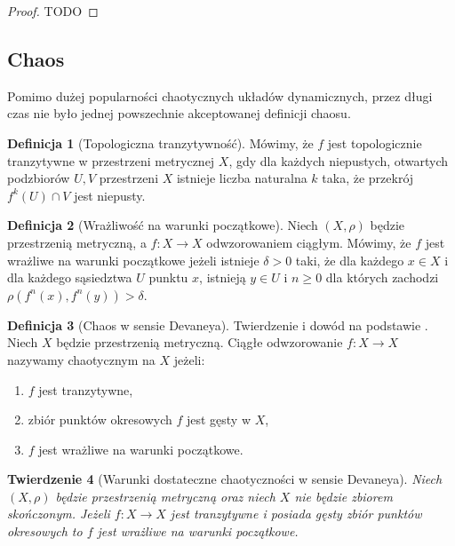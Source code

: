\documentclass[licencjacka]{pwr_wmat_praca_dyplomowa}
\theoremstyle{plain}
\newtheorem{theorem}{Twierdzenie}
\numberwithin{theorem}{chapter}
\theoremstyle{definition}
\numberwithin{theorem}{chapter}
\newtheorem{definition}[theorem]{Definicja}
\begin{document}
\begin{proof}
TODO
\end{proof}



\subsection{Chaos}

\cite{onDeveneyDefinitionOfChaos}

Pomimo dużej popularności chaotycznych układów dynamicznych, przez długi czas nie było jednej powszechnie akceptowanej definicji chaosu.

\begin{definition}[Topologiczna tranzytywność]
\cite{onDeveneyDefinitionOfChaos}
Mówimy, że $f$ jest topologicznie tranzytywne w przestrzeni metrycznej $X$, gdy dla każdych niepustych, otwartych podzbiorów $U, V$ przestrzeni $X$ istnieje liczba naturalna $k$ taka, że przekrój $f^k(U) \cap V$ jest niepusty.
\end{definition}

\begin{definition}[Wrażliwość na warunki początkowe]
\cite{balibrea2003topological}
Niech $(X, \rho)$ będzie przestrzenią metryczną, a $f: X \rightarrow X$ odwzorowaniem ciągłym.
Mówimy, że $f$ jest wrażliwe na warunki początkowe jeżeli  istnieje $\delta > 0$ taki, że dla każdego $x \in X$ i dla każdego sąsiedztwa $U$ punktu $x$, istnieją $y \in U$ i $n \geq 0$ dla których zachodzi $\rho(f^n(x), f^n(y)) > \delta$.
\end{definition}

\begin{definition}[Chaos w sensie Devaneya]
Twierdzenie i dowód na podstawie \cite{onDeveneyDefinitionOfChaos}.
Niech $X$ będzie przestrzenią metryczną. Ciągłe odwzorowanie $f: X \rightarrow X$ nazywamy chaotycznym na $X$ jeżeli:
\begin{enumerate}
\item $f$ jest tranzytywne,
\item zbiór punktów okresowych $f$ jest gęsty w $X$,
\item $f$ jest wrażliwe na warunki początkowe.
\end{enumerate}
\end{definition}


\begin{theorem}
[Warunki dostateczne chaotyczności w sensie Devaneya]
\label{warunki_dostateczne_chaotycznosci_devaneya}
\cite{onDeveneyDefinitionOfChaos}
Niech $(X, \rho)$ będzie przestrzenią metryczną oraz niech $X$ nie będzie zbiorem skończonym.
Jeżeli $f: X \rightarrow X$ jest tranzytywne i posiada gęsty zbiór punktów okresowych to $f$ jest wrażliwe na warunki początkowe.
\end{theorem}
\end{document}
